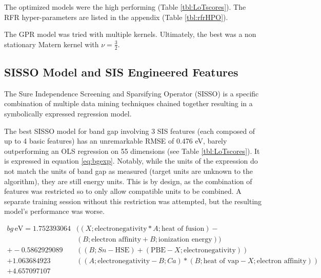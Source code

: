 The optimized models were the high performing (Table \ref{tbl:LoTscores}).
The RFR hyper-parameters are listed in the appendix (Table \ref{tbl:rfrHPO}).

The GPR model was tried with multiple kernels.
Ultimately, the best was a non stationary Matern kernel with \(\nu = \frac{3}{2}\).

\subsection{SISSO Model and SIS Engineered Features}
\label{sec:orgb604462}
The Sure Independence Screening and Sparsifying Operator (SISSO) is a specific combination of multiple data mining techniques chained together resulting in a symbolically expressed regression model.
\autocite{ouyang-2018-sisso,ghiringhelli-2017-learn-physic} 

The best SISSO model for band gap involving 3 SIS features (each composed of up to 4 basic features) has an unremarkable RMSE of 0.476 eV, barely outperforming an OLS regression on 55 dimensions (see Table \ref{tbl:LoTscores}).
It is expressed in equation \ref{eq:bgexp}.
Notably, while the units of the expression do not match the units of band gap as measured (target units are unknown to the algorithm), they are still energy units.
This is by design, as the combination of features was restricted so to only allow compatible units to be combined.
A separate training session without this restriction was attempted, but the resulting model's performance was worse.

\begin{align}
\label{eq:bgexp}
bg\,\si{\electronvolt} = 1.752393064 &((X;\mbox{electronegativity}*A;\mbox{heat of fusion})-\nonumber\\&(B;\mbox{electron affinity}+B;\mbox{ionization energy}))\nonumber\\+-0.5862929089 &((B;Sn-\mbox{HSE})+(\mbox{PBE}-X;\mbox{electronegativity}))\nonumber\\+1.063684923 &((A;\mbox{electronegativity}-B;Ca)*(B;\mbox{heat of vap}-X;\mbox{electron affinity}))\nonumber\\+4.657097107
\end{align}

